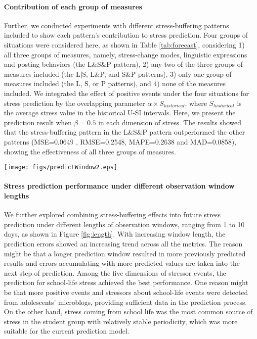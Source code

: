 \documentclass[5p,times,numbers,authoryear]{elsarticle}
\begin{document}
\paragraph{Contribution of each group of measures}
Further, we conducted experiments with different stress-buffering patterns included
{to show each pattern's contribution to stress prediction.}
Four groups of situations were considered here, as shown in Table \ref{tab:forecast},
considering
1) all three groups of measures, namely, stress-change modes, linguistic expressions and posting behaviors (the L\&S\&P pattern),
2) any two of the three groups of measures included (the L$|$S, L\&P, and S\&P patterns),
3) only one group of measures included (the L, S, or P patterns),
and 4) none of the measures included.
We integrated the effect of positive events under the four situations for stress prediction by the overlapping parameter $\alpha \times S_{historical}$,
where $S_{historical}$ is the average stress value in the historical U-SI intervals.
Here, we present the prediction result when $\beta = 0.5$ in each dimension of stress.
The results showed that the stress-buffering pattern in the L\&S\&P pattern outperformed the other patterns (MSE=0.0649 , RMSE=0.2548, MAPE=0.2638 and MAD=0.0858),
showing the effectiveness of all three groups of measures.
\begin{figure*}
\centering
\caption{Adolescents' stress prediction performance under different observation window lengths.}
\texttt{[image: figs/predictWindow2.eps]}
\label{fig:length}
\end{figure*}

\paragraph{Stress prediction performance under different observation window lengths}
We further explored combining stress-buffering effects into future stress prediction under different lengths of observation windows, ranging from 1 to 10 days, as shown in Figure \ref{fig:length}.
With increasing window length, the prediction errors showed an increasing trend across all the metrics.
The reason might be that a longer prediction window resulted in more previously predicted results and errors accumulating with more predicted values are taken into the next step of prediction.
Among the five dimensions of stressor events, the prediction for school-life stress achieved the best performance.
One reason might be that more positive events and stressors about school-life events were detected from adolescents' microblogs, providing sufficient data in the prediction process.
On the other hand, stress coming from school life was the most common source of stress in the student group
with relatively stable periodicity,
which was more suitable for the current prediction model.
\end{document}
